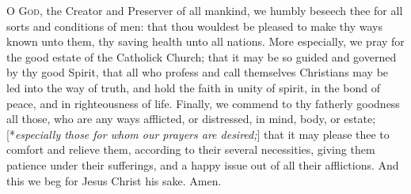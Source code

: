 


\lettrine{O}{ God,} the Creator and Preserver of all mankind, we humbly beseech thee for all sorts and conditions of men: that thou wouldest be pleased to make thy ways known unto them, thy saving health unto all nations. More especially, we pray for the good estate of the Catholick Church; that it may be so guided and governed by thy good Spirit, that all who profess and call themselves Christians may be led into the way of truth, and hold the faith in unity of spirit, in the bond of peace,
and in righteousness of life. Finally, we commend to thy fatherly goodness all those, who are any ways afflicted, or distressed, in
mind, body, or estate; [*\emph{especially those for whom our prayers are desired;}] that it may please thee to comfort and relieve them, according to their several necessities, giving them patience under their sufferings, and a happy issue out of all their afflictions. And this we beg for Jesus Christ his sake. \R Amen.
\bigskip

